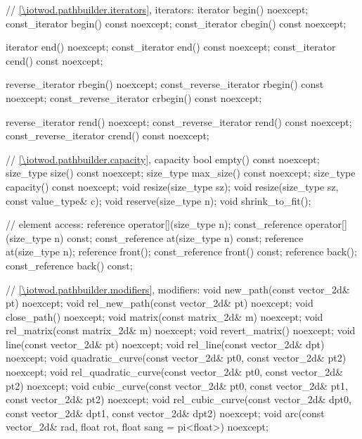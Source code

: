 \begin{codeblock}
{{    // \ref{\iotwod.pathbuilder.iterators}, iterators:
    iterator begin() noexcept;
    const_iterator begin() const noexcept;
    const_iterator cbegin() const noexcept;

    iterator end() noexcept;
    const_iterator end() const noexcept;
    const_iterator cend() const noexcept;
    
    reverse_iterator rbegin() noexcept;
    const_reverse_iterator rbegin() const noexcept;
    const_reverse_iterator crbegin() const noexcept;

    reverse_iterator rend() noexcept;
    const_reverse_iterator rend() const noexcept;
    const_reverse_iterator crend() const noexcept;
    
    // \ref{\iotwod.pathbuilder.capacity}, capacity
    bool empty() const noexcept;
    size_type size() const noexcept;
    size_type max_size() const noexcept;
    size_type capacity() const noexcept;
    void resize(size_type sz);
    void resize(size_type sz, const value_type& c);
    void reserve(size_type n);
    void shrink_to_fit();

    // element access:
    reference operator[](size_type n);
    const_reference operator[](size_type n) const;
    const_reference at(size_type n) const;
    reference at(size_type n);
    reference front();
    const_reference front() const;
    reference back();
    const_reference back() const;

    // \ref{\iotwod.pathbuilder.modifiers}, modifiers:
    void new_path(const vector_2d& pt) noexcept;
    void rel_new_path(const vector_2d& pt) noexcept;
    void close_path() noexcept;
    void matrix(const matrix_2d& m) noexcept;
    void rel_matrix(const matrix_2d& m) noexcept;
    void revert_matrix() noexcept;
    void line(const vector_2d& pt) noexcept;
    void rel_line(const vector_2d& dpt) noexcept;
    void quadratic_curve(const vector_2d& pt0, const vector_2d& pt2)
      noexcept;
    void rel_quadratic_curve(const vector_2d& pt0, const vector_2d& pt2)
      noexcept;
    void cubic_curve(const vector_2d& pt0, const vector_2d& pt1,
      const vector_2d& pt2) noexcept;
    void rel_cubic_curve(const vector_2d& dpt0, const vector_2d& dpt1,
      const vector_2d& dpt2) noexcept;
    void arc(const vector_2d& rad, float rot, float sang = pi<float>)
      noexcept;
    
}}
\end{codeblock}

